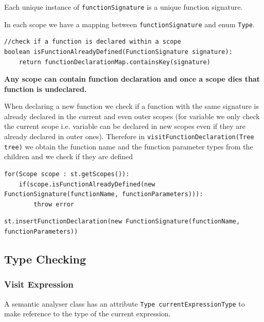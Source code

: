 Each unique instance of \verb!functionSignature! is a unique  function signature. 

In each scope we have a mapping between \verb!functionSignature! and enum \verb!Type!.
\begin{lstlisting}[caption=PSEUDOCODE of isFunctionAlreadyDefined(FunctionSignature signature) inside class \emph{SCOPE}]
//check if a function is declared within a scope
boolean isFunctionAlreadyDefined(FunctionSignature signature):
    return functionDeclarationMap.containsKey(signature)
\end{lstlisting}










\textbf{Any scope can contain function declaration and once a scope dies that function is undeclared.}

When declaring a new function we check if a function with the same signature is already declared in the current and even outer scopes (for variable we only check the current scope i.e. variable can be declared in new scopes even if they are already declared in outer ones). Therefore in \verb!visitFunctionDeclaration(Tree tree)! we obtain the function name and the function parameter types from the children and we check  if they are defined 

\begin{lstlisting}[caption=PSEUDOCODE: checking if a function is already declared in all scopes]
for(Scope scope : st.getScopes()):
    if(scope.isFunctionAlreadyDefined(new FunctionSignature(functionName, functionParameters))):
        throw error
\end{lstlisting}
\begin{lstlisting}[caption=PSEUDOCODE:  if a function is not  declared in all scopes we push it to current scope via class SymbolTable]
st.insertFunctionDeclaration(new FunctionSignature(functionName, functionParameters))
\end{lstlisting}


\subsection{Type Checking}
\subsubsection{Visit Expression}

A semantic analyser class has an attribute \verb!Type currentExpressionType! to make reference to the type of the current expression. 


